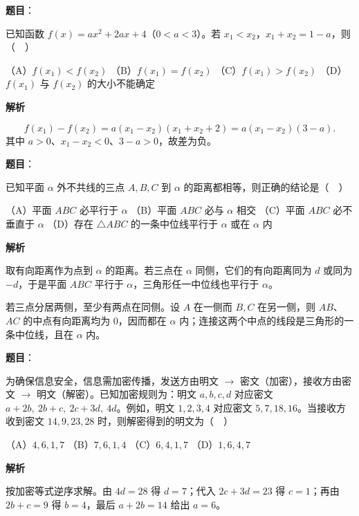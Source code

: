 \begin{answer}

\textbf{题目}：

已知函数 \(f(x)=ax^2+2ax+4\)（\(0<a<3\)）。若 \(x_1<x_2\)，\(x_1+x_2=1-a\)，则（　）

（A）\(f(x_1)<f(x_2)\)
（B）\(f(x_1)=f(x_2)\)
（C）\(f(x_1)>f(x_2)\)
（D）\(f(x_1)\) 与 \(f(x_2)\) 的大小不能确定

\textbf{解析}

\nopagebreak[4]
\[
f(x_1)-f(x_2)
=a(x_1-x_2)(x_1+x_2+2)
=a(x_1-x_2)(3-a).
\]
其中 \(a>0\)、\(x_1-x_2<0\)、\(3-a>0\)，故差为负。


\end{answer}
\begin{answer}

\textbf{题目}：

已知平面 \(\alpha\) 外不共线的三点 \(A,B,C\) 到 \(\alpha\) 的距离都相等，则正确的结论是（　）

（A）平面 \(ABC\) 必平行于 \(\alpha\)
（B）平面 \(ABC\) 必与 \(\alpha\) 相交
（C）平面 \(ABC\) 必不垂直于 \(\alpha\)
（D）存在 \(\triangle ABC\) 的一条中位线平行于 \(\alpha\) 或在 \(\alpha\) 内

\textbf{解析}

取有向距离作为点到 \(\alpha\) 的距离。若三点在 \(\alpha\) 同侧，它们的有向距离同为 \(d\) 或同为 \(-d\)，于是平面 \(ABC\) 平行于 \(\alpha\)，三角形任一中位线也平行于 \(\alpha\)。

若三点分居两侧，至少有两点在同侧。设 \(A\) 在一侧而 \(B,C\) 在另一侧，则 \(AB\)、\(AC\) 的中点有向距离均为 0，因而都在 \(\alpha\) 内；连接这两个中点的线段是三角形的一条中位线，且在 \(\alpha\) 内。


\end{answer}
\begin{answer}

\textbf{题目}：

为确保信息安全，信息需加密传播，发送方由明文 \(\to\) 密文（加密），接收方由密文 \(\to\) 明文（解密）。已知加密规则为：明文 \(a,b,c,d\) 对应密文 \(a+2b,\ 2b+c,\ 2c+3d,\ 4d\)。例如，明文 \(1,2,3,4\) 对应密文 \(5,7,18,16\)。当接收方收到密文 \(14,9,23,28\) 时，则解密得到的明文为（　）

（A）\(4,6,1,7\)
（B）\(7,6,1,4\)
（C）\(6,4,1,7\)
（D）\(1,6,4,7\)

\textbf{解析}

按加密等式逆序求解。由 \(4d=28\) 得 \(d=7\)；代入 \(2c+3d=23\) 得 \(c=1\)；再由 \(2b+c=9\) 得 \(b=4\)，最后 \(a+2b=14\) 给出 \(a=6\)。


\end{answer}
